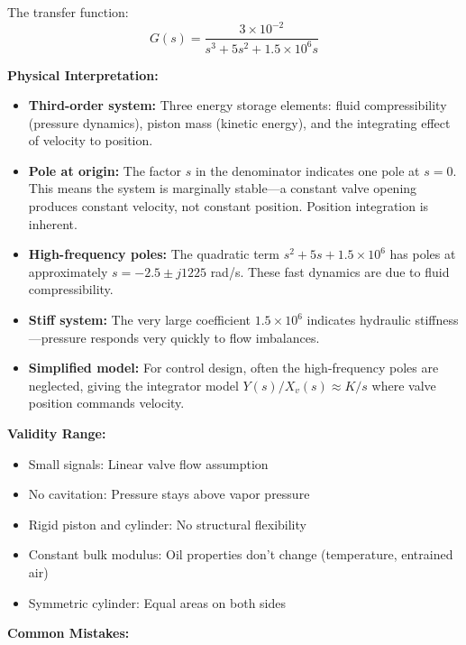 \begin{example}
The transfer function:
\begin{equation}
\boxed{G(s) = \frac{3 \times 10^{-2}}{s^3 + 5s^2 + 1.5 \times 10^6 s}}
\end{equation}

\textbf{Physical Interpretation:}

\begin{itemize}
    \item \textbf{Third-order system:} Three energy storage elements: fluid compressibility (pressure dynamics), piston mass (kinetic energy), and the integrating effect of velocity to position.

    \item \textbf{Pole at origin:} The factor $s$ in the denominator indicates one pole at $s=0$. This means the system is marginally stable—a constant valve opening produces constant velocity, not constant position. Position integration is inherent.

    \item \textbf{High-frequency poles:} The quadratic term $s^2 + 5s + 1.5 \times 10^6$ has poles at approximately $s = -2.5 \pm j1225$ rad/s. These fast dynamics are due to fluid compressibility.

    \item \textbf{Stiff system:} The very large coefficient $1.5 \times 10^6$ indicates hydraulic stiffness—pressure responds very quickly to flow imbalances.

    \item \textbf{Simplified model:} For control design, often the high-frequency poles are neglected, giving the integrator model $Y(s)/X_v(s) \approx K/s$ where valve position commands velocity.
\end{itemize}

\textbf{Validity Range:}

\begin{itemize}
    \item Small signals: Linear valve flow assumption
    \item No cavitation: Pressure stays above vapor pressure
    \item Rigid piston and cylinder: No structural flexibility
    \item Constant bulk modulus: Oil properties don't change (temperature, entrained air)
    \item Symmetric cylinder: Equal areas on both sides
\end{itemize}

\textbf{Common Mistakes:}


\end{example}
